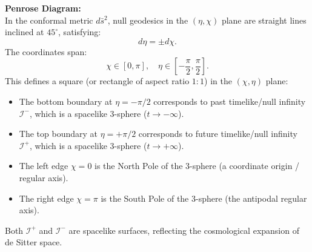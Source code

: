\documentclass[12pt]{article}
\begin{document}
\begin{enumerate}[label=\alph*)]
\vspace{0.8em}
\noindent\textbf{Penrose Diagram:}\\
In the conformal metric $d\bar{s}^2$, null geodesics in the $(\eta, \chi)$ plane are straight lines inclined at $45^\circ$, satisfying:
\begin{equation}
d\eta = \pm d\chi.
\end{equation}
The coordinates span:
\begin{equation}
\chi \in [0, \pi], \quad \eta \in \left[-\frac{\pi}{2}, \frac{\pi}{2}\right].
\end{equation}
This defines a square (or rectangle of aspect ratio $1:1$) in the $(\chi, \eta)$ plane:
\begin{itemize}
\item The bottom boundary at $\eta = -\pi/2$ corresponds to past timelike/null infinity $\mathcal{I}^-$, which is a spacelike 3-sphere ($t \to -\infty$).
\item The top boundary at $\eta = +\pi/2$ corresponds to future timelike/null infinity $\mathcal{I}^+$, which is a spacelike 3-sphere ($t \to +\infty$).
\item The left edge $\chi = 0$ is the North Pole of the 3-sphere (a coordinate origin / regular axis).
\item The right edge $\chi = \pi$ is the South Pole of the 3-sphere (the antipodal regular axis).
\end{itemize}

\begin{center}
\end{center}
Both $\mathcal{I}^+$ and $\mathcal{I}^-$ are spacelike surfaces, reflecting the cosmological expansion of de Sitter space.
\end{enumerate}
\end{document}
